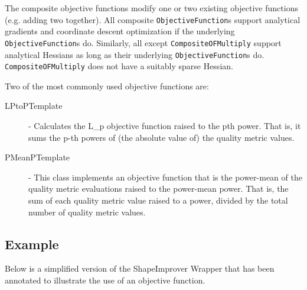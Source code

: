 The composite objective functions modify one or two existing objective functions (e.g. adding two together).  All composite \texttt{ObjectiveFunction}s support analytical gradients and coordinate descent optimization if the underlying \texttt{ObjectiveFunction}s do.  Similarly, all except \texttt{CompositeOFMultiply} support analytical Hessians as long as their underlying \texttt{ObjectiveFunction}s do.  \texttt{CompositeOFMultiply} does not have a suitably sparse Hessian.

Two of the most commonly used objective functions are:

\begin{description}
\item[LPtoPTemplate] - Calculates the L\_p objective function raised to the pth power.
    That is, it sums the p-th powers of (the absolute value of) the quality metric values.

\item[PMeanPTemplate] - This class implements an objective function that is the power-mean
    of the quality metric evaluations raised to the power-mean power.  That is, the sum of 
   each quality metric value raised to a power, divided by the total number of quality 
   metric values.
\end{description}

\subsection{Example}

Below is a simplified version of the ShapeImprover Wrapper that has been annotated to illustrate the use of an objective function.

